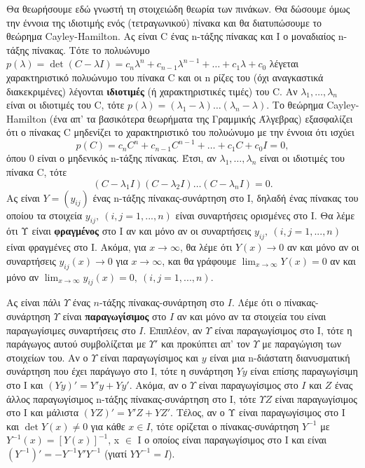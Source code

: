 \documentclass[11pt,a4paper,twoside]{book}
\begin{document}
Θα θεωρήσουμε εδώ γνωστή τη στοιχειώδη θεωρία των πινάκων. Θα δώσουμε όμως την έννοια της ιδιοτιμής ενός (τετραγωνικού) πίνακα και θα διατυπώσουμε το θεώρημα Cayley-Hamilton. Aς είναι C ένας n-τάξης πίνακας και Ι ο μοναδιαίος n-τάξης πίνακας. Τότε το πολυώνυμο $p(\lambda) = \det(C - \lambda I) = c_n \lambda^n + c_{n-1} \lambda^{n-1} + \dots + c_1 \lambda + c_0$ λέγεται χαρακτηριστικό πολυώνυμο του πίνακα C και οι n ρίζες του (όχι αναγκαστικά διακεκριμένες) λέγονται \textbf{ιδιοτιμές} (ή χαρακτηριστικές τιμές) του C. Αν $\lambda_1, \dots, \lambda_n$ είναι οι ιδιοτιμές του C, τότε $p(\lambda) = (\lambda_1 - \lambda) \dots (\lambda_n - \lambda)$. Το θεώρημα Cayley-Hamilton (ένα απ' τα βασικότερα θεωρήματα της Γραμμικής Άλγεβρας) εξασφαλίζει ότι ο πίνακας C μηδενίζει το χαρακτηριστικό του πολυώνυμο με την έννοια ότι ισχύει
\[
p(C) = c_n C^n + c_{n-1} C^{n-1} + \dots + c_1 C + c_0 I = 0,
\]
όπου 0 είναι ο μηδενικός n-τάξης πίνακας. Έτσι, αν $\lambda_1, \dots, \lambda_n$ είναι οι ιδιοτιμές του πίνακα C, τότε
\[
(C-\lambda_1 I)(C-\lambda_2 I) \dots (C-\lambda_n I) = 0.
\]
Ας είναι $Y = (y_{ij})$ ένας n-τάξης πίνακας-συνάρτηση στο Ι, δηλαδή ένας πίνακας του οποίου τα στοιχεία $y_{ij},\  (i,j=1,...,n)$ είναι συναρτήσεις ορισμένες στο Ι. Θα λέμε ότι Υ είναι \textbf{φραγμένος} στο Ι αν και μόνο αν οι συναρτήσεις $y_{ij},\  (i,j=1,...,n)$ είναι φραγμένες στο Ι. Ακόμα, για $x \to \infty$, θα λέμε ότι $Y(x) \to 0$ αν και μόνο αν οι συναρτήσεις $y_{ij}(x) \to 0$ για $x \to \infty$, και θα γράφουμε $\lim_{x\to\infty} Y(x) = 0$ αν και μόνο αν $\lim_{x\to\infty} y_{ij}(x) = 0,\  (i,j=1,...,n).$

Ας είναι πάλι $Υ$ ένας $n$-τάξης πίνακας-συνάρτηση στο $Ι$. Λέμε ότι ο πίνακας-συνάρτηση $Υ$ είναι \textbf{παραγωγίσιμος} στο $Ι$ αν και μόνο αν τα στοιχεία του είναι παραγωγίσιμες συναρτήσεις στο $Ι$. Επιπλέον, αν $Υ$ είναι παραγωγίσιμος στο Ι, τότε η παράγωγος αυτού συμβολίζεται με $Υ'$ και προκύπτει απ' τον $Υ$ με παραγώγιση των στοιχείων του. Αν ο $Υ$ είναι παραγωγίσιμος και $y$ είναι μια n-διάστατη διανυσματική συνάρτηση που έχει παράγωγο στο Ι, τότε η συνάρτηση $Yy$ είναι επίσης παραγωγίσιμη στο Ι και $(Yy)' = Y'y + Yy'$. Ακόμα, αν ο $Υ$ είναι παραγωγίσιμος στο $Ι$ και $Ζ$ ένας άλλος παραγωγίσιμος n-τάξης πίνακας-συνάρτηση στο Ι, τότε $ΥΖ$ είναι παραγωγίσιμος στο Ι και μάλιστα $(YZ)' = Y'Z + YZ'$. Τέλος, αν ο Υ είναι παραγωγίσιμος στο Ι και $\det Y(x) \neq 0$ για κάθε $x \in I$, τότε ορίζεται ο πίνακας-συνάρτηση $Y^{-1}$ με $Y^{-1}(x) = [Y(x)]^{-1}$, x $\in$ Ι ο οποίος είναι παραγωγίσιμος στο Ι και είναι $(Y^{-1})' = -Y^{-1}Y'Y^{-1}$ (γιατί $Y Y^{-1}=I$).
\end{document}
